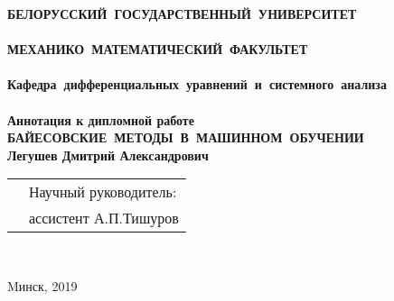 
\setcounter{page}{1}
\thispagestyle{empty}
\begin{center}
\bf
\vspace{4cm}
{
\mbox{БЕЛОРУССКИЙ~ГОСУДАРСТВЕННЫЙ~УНИВЕРСИТЕТ} \\~\\
\mbox{МЕХАНИКО~МАТЕМАТИЧЕСКИЙ~ФАКУЛЬТЕТ} \\~\\
\mbox{Кафедра дифференциальных уравнений и системного анализа} \\~\\
}
\vspace{3.5cm}
\bf
Аннотация к дипломной работе \\
\vspace{0.5cm} 
\mbox{БАЙЕСОВСКИЕ МЕТОДЫ В МАШИННОМ ОБУЧЕНИИ}\\
\vspace{0.7cm} 
\rm Легушев Дмитрий Александрович\\
\vspace{1.5cm}
\small

\vspace{2cm}
\end{center}
\begin{tabular}{ll}
\hspace{12.5cm}
&Научный руководитель:\\
&ассистент А.П.Тишуров\\
\end{tabular}\\
\vspace{7.5cm}
\begin{center}
    Mинск, 2019
\end{center}
\clearpage
\restoregeometry

